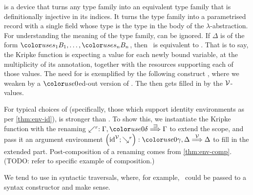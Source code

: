  is a device that turns any type family into an equivalent
type family that is definitionally injective in its indices.
It turns the type family into a parametrised record with a single field
 whose type is the type in the body of the $\lambda$-abstraction.
For understanding the meaning of the type family,  can be
ignored.
If $\Delta$ is of the form $\gr{s_1}B_1, \ldots, \gr{s_n}B_n$, then
\ is equivalent to
.
That is to say, the Kripke function is expecting a value for each newly bound
variable, at the multiplicity of its annotation, together with the resources
supporting each of those values.
The need for  is exemplified by the following construct
, where we weaken \AgdaBound{$\Gamma$} by a $\gr0$ed-out
version of \AgdaBound{$\Delta$}.
The \AgdaBound{$\Delta$} then gets filled in by the $\V$-values.

For typical choices of \AgdaBound{$\V$} (specifically, those which support
identity environments as per \cref{thm:env-id}),
\AgdaSpace{}\AgdaBound{$\V$}\AgdaSpace{}\AgdaBound{$\C$}
is stronger than \AgdaSpace{}\AgdaBound{$\C$}.
To show this, we instantiate the Kripke function with the renaming
$\swarrow^r : \Gamma, \gr0\delta \env\sqni \Gamma$ to extend the scope, and
pass it an argument environment
$\plr{\id^\V; \searrow^r} : \gr0\gamma, \Delta \env\V \Delta$ to fill in the
extended part.
Post-composition of a renaming comes from \cref{thm:env-comp}.
{\color{red}(TODO: refer to specific example of composition.)}


We tend to use  in syntactic traversals, where, for example,
\ could be passed to a syntax
constructor and make sense.




